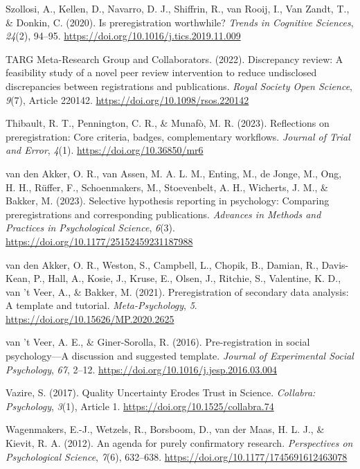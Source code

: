 \documentclass[authordate, meta, issue]{jote-new-article}
\begin{document}
	Szollosi, A., Kellen, D., Navarro, D. J., Shiffrin, R., van Rooij, I., Van Zandt, T., \& Donkin, C. (2020). Is preregistration worthwhile? \emph{Trends in Cognitive Sciences}, \emph{24}(2), 94--95. \url{https://doi.org/10.1016/j.tics.2019.11.009}



	TARG Meta-Research Group and Collaborators. (2022). Discrepancy review: A feasibility study of a novel peer review intervention to reduce undisclosed discrepancies between registrations and publications. \emph{Royal Society Open Science}, \emph{9}(7), Article 220142. \url{https://doi.org/10.1098/rsos.220142}



	Thibault, R. T., Pennington, C. R., \& Munafò, M. R. (2023). Reflections on preregistration: Core criteria, badges, complementary workflows. \emph{Journal of Trial and Error}, \emph{4}(1). \url{https://doi.org/10.36850/mr6}



	van den Akker, O. R., van Assen, M. A. L. M., Enting, M., de Jonge, M., Ong, H. H., Rüffer, F., Schoenmakers, M., Stoevenbelt, A. H., Wicherts, J. M., \& Bakker, M. (2023). Selective hypothesis reporting in psychology: Comparing preregistrations and corresponding publications. \emph{Advances in Methods and Practices in Psychological Science}, \emph{6}(3). \url{https://doi.org/10.1177/25152459231187988}



	van den Akker, O. R., Weston, S., Campbell, L., Chopik, B., Damian, R., Davis-Kean, P., Hall, A., Kosie, J., Kruse, E., Olsen, J., Ritchie, S., Valentine, K. D., van 't Veer, A., \& Bakker, M. (2021). Preregistration of secondary data analysis: A template and tutorial. \emph{Meta-Psychology}, \emph{5}. \url{https://doi.org/10.15626/MP.2020.2625}



	van 't Veer, A. E., \& Giner-Sorolla, R. (2016). Pre-registration in social psychology—A discussion and suggested template. \emph{Journal of Experimental Social Psychology}, \emph{67}, 2--12. \url{https://doi.org/10.1016/j.jesp.2016.03.004}



	Vazire, S. (2017). Quality Uncertainty Erodes Trust in Science. \emph{Collabra: Psychology}, \emph{3}(1), Article 1. \url{https://doi.org/10.1525/collabra.74}



	Wagenmakers, E.-J., Wetzels, R., Borsboom, D., van der Maas, H. L. J., \& Kievit, R. A. (2012). An agenda for purely confirmatory research. \emph{Perspectives on Psychological Science}, \emph{7}(6), 632--638. \url{https://doi.org/10.1177/1745691612463078}
\end{document}
